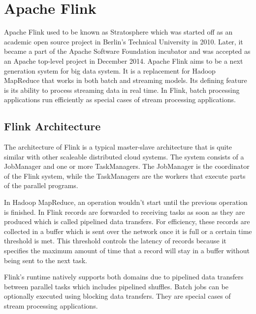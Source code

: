 \section{Apache Flink}
Apache Flink used to be known as Stratosphere which was started off as an academic open source project in Berlin's Technical University in 2010. Later, it became a part of the Apache Software Foundation incubator and was accepted as an Apache top-level project in December 2014. Apache Flink aims to be a next generation system for big data system. It is a replacement for Hadoop MapReduce that works in both batch and streaming models. Its defining feature is its ability to process streaming data in real time. In Flink, batch processing applications run efficiently as special cases of stream processing applications.

\subsection{Flink Architecture}
The architecture of Flink is a typical master-slave architecture that is quite similar with other scaleable distributed cloud systems. The system consists of a JobManager and one or more TaskManagers. The JobManager is the coordinator of the Flink system, while the TaskManagers are the workers that execute parts of the parallel programs. 

In Hadoop MapReduce, an operation wouldn't start until the previous operation is finished. In Flink records are forwarded to receiving tasks as soon as they are produced which is called pipelined data transfers. For efficiency, these records are collected in a buffer which is sent over the network once it is full or a certain time threshold is met. This threshold controls the latency of records because it specifies the maximum amount of time that a record will stay in a buffer without being sent to the next task. 

Flink's runtime natively supports both domains due to pipelined data transfers between parallel tasks which includes pipelined shuffles. Batch jobs can be optionally executed using blocking data transfers. They are special cases of stream processing applications.


